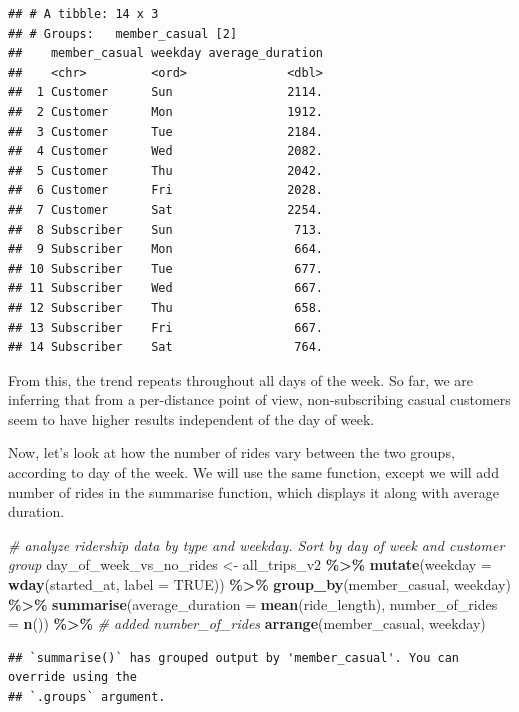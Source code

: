\documentclass[
]{article}
\newenvironment{Shaded}{\begin{snugshade}}{\end{snugshade}}
\newcommand{\AttributeTok}[1]{\textcolor[rgb]{0.13,0.29,0.53}{#1}}
\newcommand{\CommentTok}[1]{\textcolor[rgb]{0.56,0.35,0.01}{\textit{#1}}}
\newcommand{\ConstantTok}[1]{\textcolor[rgb]{0.56,0.35,0.01}{#1}}
\newcommand{\FunctionTok}[1]{\textcolor[rgb]{0.13,0.29,0.53}{\textbf{#1}}}
\newcommand{\NormalTok}[1]{#1}
\newcommand{\OtherTok}[1]{\textcolor[rgb]{0.56,0.35,0.01}{#1}}
\newcommand{\SpecialCharTok}[1]{\textcolor[rgb]{0.81,0.36,0.00}{\textbf{#1}}}
\begin{document}
\begin{verbatim}
## # A tibble: 14 x 3
## # Groups:   member_casual [2]
##    member_casual weekday average_duration
##    <chr>         <ord>              <dbl>
##  1 Customer      Sun                2114.
##  2 Customer      Mon                1912.
##  3 Customer      Tue                2184.
##  4 Customer      Wed                2082.
##  5 Customer      Thu                2042.
##  6 Customer      Fri                2028.
##  7 Customer      Sat                2254.
##  8 Subscriber    Sun                 713.
##  9 Subscriber    Mon                 664.
## 10 Subscriber    Tue                 677.
## 11 Subscriber    Wed                 667.
## 12 Subscriber    Thu                 658.
## 13 Subscriber    Fri                 667.
## 14 Subscriber    Sat                 764.
\end{verbatim}

From this, the trend repeats throughout all days of the week. So far, we
are inferring that from a per-distance point of view, non-subscribing
casual customers seem to have higher results independent of the day of
week.

Now, let's look at how the number of rides vary between the two groups,
according to day of the week. We will use the same function, except we
will add number of rides in the summarise function, which displays it
along with average duration.

\begin{Shaded}
\begin{Highlighting}[]
\CommentTok{\# analyze ridership data by type and weekday. Sort by day of week and customer group}
\NormalTok{day\_of\_week\_vs\_no\_rides }\OtherTok{\textless{}{-}}\NormalTok{ all\_trips\_v2 }\SpecialCharTok{\%\textgreater{}\%}
\FunctionTok{mutate}\NormalTok{(}\AttributeTok{weekday =} \FunctionTok{wday}\NormalTok{(started\_at, }\AttributeTok{label =} \ConstantTok{TRUE}\NormalTok{)) }\SpecialCharTok{\%\textgreater{}\%} 
\FunctionTok{group\_by}\NormalTok{(member\_casual, weekday) }\SpecialCharTok{\%\textgreater{}\%} 
\FunctionTok{summarise}\NormalTok{(}\AttributeTok{average\_duration =} \FunctionTok{mean}\NormalTok{(ride\_length), }\AttributeTok{number\_of\_rides =} \FunctionTok{n}\NormalTok{()) }\SpecialCharTok{\%\textgreater{}\%}  \CommentTok{\# added number\_of\_rides}
\FunctionTok{arrange}\NormalTok{(member\_casual, weekday)}
\end{Highlighting}
\end{Shaded}

\begin{verbatim}
## `summarise()` has grouped output by 'member_casual'. You can override using the
## `.groups` argument.
\end{verbatim}
\end{document}

